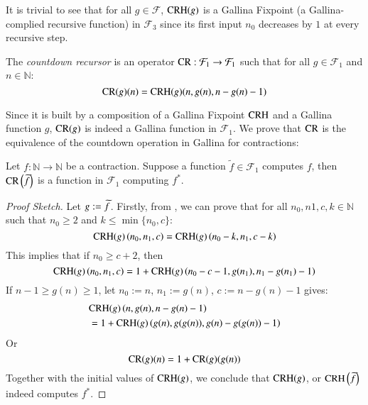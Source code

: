 It is trivial to see that for all $g\in \mathcal{F}$, $\text{CRH}(g)$ is a Gallina Fixpoint (a Gallina-complied recursive function) in $\mathcal{F}_3$ since its first input $n_0$ decreases by $1$ at every recursive step.

\begin{defn} \label{defn: countdown rec}
The \textit{countdown recursor} is an operator $\text{CR} : \mathcal{F}_1 \to \mathcal{F}_1$ such that for all $g\in \mathcal{F}_1$ and $n\in \mathbb{N}$:
\begin{equation}
\text{CR}(g)(n) = \text{CRH}(g)(n, g(n), n - g(n) - 1)
\end{equation}
\end{defn}

Since it is built by a composition of a Gallina Fixpoint $\text{CRH}$ and a Gallina function $g$, $\text{CR}(g)$ is indeed a Gallina function in $\mathcal{F}_1$. We prove that $\text{CR}$ is the equivalence of the countdown operation in Gallina for contractions:

\begin{lem} \label{lem: CRH_countdown}
Let $f: \mathbb{N}\to \mathbb{N}$ be a contraction. Suppose a function $\widetilde{f}\in \mathcal{F}_1$ computes $f$, then $\text{CR}\left(\widetilde{f}\right)$ is a function in $\mathcal{F}_1$ computing $f^*$.
\end{lem}

\begin{proof}[Proof Sketch]
Let $g := \widetilde{f}$.
Firstly, from , we can prove that for all $n_0, n1, c, k\in \mathbb{N}$ such that $n_0\ge 2$ and $k\le \min\{n_0, c\}$:
\begin{equation*}
\text{CRH}(g)\left(n_0, n_1, c\right) = \text{CRH}(g)\left(n_0 - k, n_1, c - k\right)
\end{equation*}
This implies that if $n_0\ge c + 2$, then
\begin{equation*}
\text{CRH}(g)\left(n_0, n_1, c\right) = 1 + \text{CRH}(g)\left(n_0 - c - 1, g(n_1), n_1 - g(n_1) - 1\right)
\end{equation*}
If $n - 1\ge g(n) \ge 1$, let $n_0 := n$, $n_1 := g(n)$, $c := n - g(n) - 1$ gives:
\begin{equation*}
\begin{aligned}
& \text{CRH}(g)\left(n, g(n), n - g(n) - 1\right) \\
& = 1 + \text{CRH}(g)\left(g(n), g(g(n)), g(n) - g(g(n)) - 1\right)
\end{aligned}
\end{equation*}
Or
\begin{equation*}
\text{CR}(g)(n) = 1 + \text{CR}(g)(g(n))
\end{equation*}
Together with the initial values of $\text{CRH}(g)$, we conclude that $\text{CRH}(g)$, or $\text{CRH}\left(\widetilde{f}\right)$ indeed computes $f^*$.

\end{proof}

